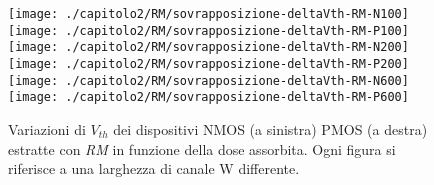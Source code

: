 \begin{figure}[H]
  \centering
  \texttt{[image: ./capitolo2/RM/sovrapposizione-deltaVth-RM-N100]}
  \texttt{[image: ./capitolo2/RM/sovrapposizione-deltaVth-RM-P100]}
  \texttt{[image: ./capitolo2/RM/sovrapposizione-deltaVth-RM-N200]}
  \texttt{[image: ./capitolo2/RM/sovrapposizione-deltaVth-RM-P200]}
  \texttt{[image: ./capitolo2/RM/sovrapposizione-deltaVth-RM-N600]}
  \texttt{[image: ./capitolo2/RM/sovrapposizione-deltaVth-RM-P600]}
  \caption{Variazioni di $V_{th}$ dei dispositivi NMOS (a sinistra) PMOS (a destra) estratte con \emph{RM} in funzione della dose assorbita. Ogni figura si riferisce a una larghezza di canale W differente.}

\end{figure}